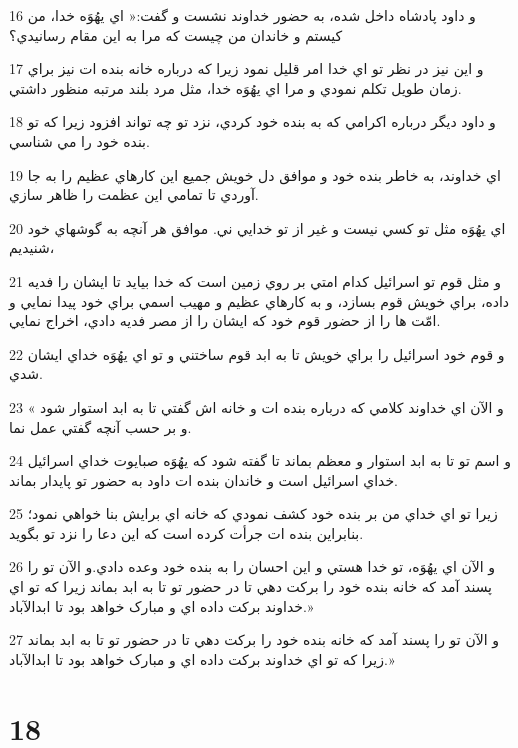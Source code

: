 \par 16 و داود پادشاه داخل شده، به حضور خداوند نشست و گفت:« اي يهُوَه خدا، من کيستم و خاندان من چيست که مرا به اين مقام رسانيدي؟
\par 17 و اين نيز در نظر تو اي خدا امر قليل نمود زيرا که درباره خانه بنده ات نيز براي زمان طويل تکلم نمودي و مرا اي يهُوَه خدا، مثل مرد بلند مرتبه منظور داشتي.
\par 18 و داود ديگر درباره اکرامي که به بنده خود کردي، نزد تو چه تواند افزود زيرا که تو بنده خود را مي شناسي.
\par 19 اي خداوند، به خاطر بنده خود و موافق دل خويش جميع اين کارهاي عظيم را به جا آوردي تا تمامي اين عظمت را ظاهر سازي. 
\par 20 اي يهُوَه مثل تو کسي نيست و غير از تو خدايي ني. موافق هر آنچه به گوشهاي خود شنيديم،
\par 21 و مثل قوم تو اسرائيل کدام امتي بر روي زمين است که خدا بيايد تا ايشان را فديه داده، براي خويش قوم بسازد، و به کارهاي عظيم و مهيب اسمي براي خود پيدا نمايي و امّت ها را از حضور قوم خود که ايشان را از مصر فديه دادي، اخراج نمايي.
\par 22 و قوم خود اسرائيل را براي خويش تا به ابد قوم ساختني و تو اي يهُوَه خداي ايشان شدي.
\par 23 « و الآن اي خداوند کلامي که درباره بنده ات و خانه اش گفتي تا به ابد استوار شود و بر حسب آنچه گفتي عمل نما.
\par 24 و اسم تو تا به ابد استوار و معظم بماند تا گفته شود که يهُوَه صبايوت خداي اسرائيل خداي اسرائيل است و خاندان بنده ات داود به حضور تو پايدار بماند.
\par 25 زيرا تو اي خداي من بر بنده خود کشف نمودي که خانه اي برايش بنا خواهي نمود؛ بنابراين بنده ات جرأت کرده است که اين دعا را نزد تو بگويد.
\par 26 و الآن اي يهُوَه، تو خدا هستي و اين احسان را به بنده خود وعده دادي.و الآن تو را پسند آمد که خانه بنده خود را برکت دهي تا در حضور تو تا به ابد بماند زيرا که تو اي خداوند برکت داده اي و مبارک خواهد بود تا ابدالآباد.»
\par 27 و الآن تو را پسند آمد که خانه بنده خود را برکت دهي تا در حضور تو تا به ابد بماند زيرا که تو اي خداوند برکت داده اي و مبارک خواهد بود تا ابدالآباد.»
 
\chapter{18}

